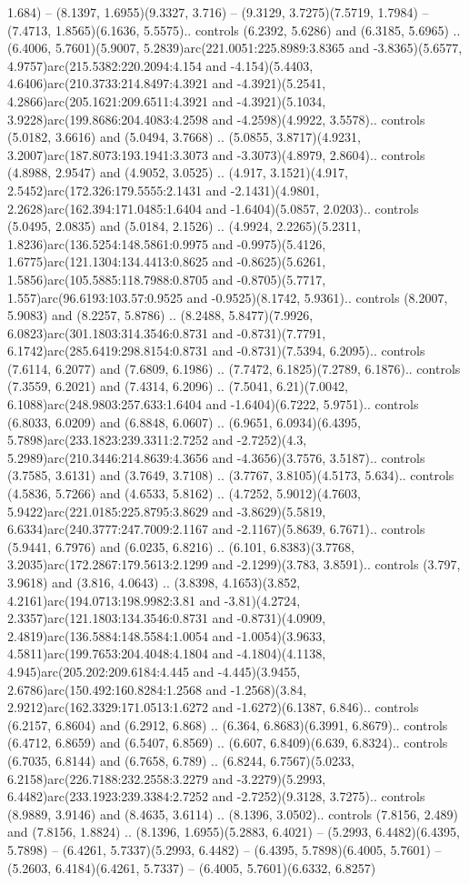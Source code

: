 1.684) -- (8.1397, 1.6955)(9.3327, 3.716) -- (9.3129, 3.7275)(7.5719, 1.7984) -- (7.4713, 1.8565)(6.1636, 5.5575).. controls (6.2392, 5.6286) and (6.3185, 5.6965) .. (6.4006, 5.7601)(5.9007, 5.2839)arc(221.0051:225.8989:3.8365 and -3.8365)(5.6577, 4.9757)arc(215.5382:220.2094:4.154 and -4.154)(5.4403, 4.6406)arc(210.3733:214.8497:4.3921 and -4.3921)(5.2541, 4.2866)arc(205.1621:209.6511:4.3921 and -4.3921)(5.1034, 3.9228)arc(199.8686:204.4083:4.2598 and -4.2598)(4.9922, 3.5578).. controls (5.0182, 3.6616) and (5.0494, 3.7668) .. (5.0855, 3.8717)(4.9231, 3.2007)arc(187.8073:193.1941:3.3073 and -3.3073)(4.8979, 2.8604).. controls (4.8988, 2.9547) and (4.9052, 3.0525) .. (4.917, 3.1521)(4.917, 2.5452)arc(172.326:179.5555:2.1431 and -2.1431)(4.9801, 2.2628)arc(162.394:171.0485:1.6404 and -1.6404)(5.0857, 2.0203).. controls (5.0495, 2.0835) and (5.0184, 2.1526) .. (4.9924, 2.2265)(5.2311, 1.8236)arc(136.5254:148.5861:0.9975 and -0.9975)(5.4126, 1.6775)arc(121.1304:134.4413:0.8625 and -0.8625)(5.6261, 1.5856)arc(105.5885:118.7988:0.8705 and -0.8705)(5.7717, 1.557)arc(96.6193:103.57:0.9525 and -0.9525)(8.1742, 5.9361).. controls (8.2007, 5.9083) and (8.2257, 5.8786) .. (8.2488, 5.8477)(7.9926, 6.0823)arc(301.1803:314.3546:0.8731 and -0.8731)(7.7791, 6.1742)arc(285.6419:298.8154:0.8731 and -0.8731)(7.5394, 6.2095).. controls (7.6114, 6.2077) and (7.6809, 6.1986) .. (7.7472, 6.1825)(7.2789, 6.1876).. controls (7.3559, 6.2021) and (7.4314, 6.2096) .. (7.5041, 6.21)(7.0042, 6.1088)arc(248.9803:257.633:1.6404 and -1.6404)(6.7222, 5.9751).. controls (6.8033, 6.0209) and (6.8848, 6.0607) .. (6.9651, 6.0934)(6.4395, 5.7898)arc(233.1823:239.3311:2.7252 and -2.7252)(4.3, 5.2989)arc(210.3446:214.8639:4.3656 and -4.3656)(3.7576, 3.5187).. controls (3.7585, 3.6131) and (3.7649, 3.7108) .. (3.7767, 3.8105)(4.5173, 5.634).. controls (4.5836, 5.7266) and (4.6533, 5.8162) .. (4.7252, 5.9012)(4.7603, 5.9422)arc(221.0185:225.8795:3.8629 and -3.8629)(5.5819, 6.6334)arc(240.3777:247.7009:2.1167 and -2.1167)(5.8639, 6.7671).. controls (5.9441, 6.7976) and (6.0235, 6.8216) .. (6.101, 6.8383)(3.7768, 3.2035)arc(172.2867:179.5613:2.1299 and -2.1299)(3.783, 3.8591).. controls (3.797, 3.9618) and (3.816, 4.0643) .. (3.8398, 4.1653)(3.852, 4.2161)arc(194.0713:198.9982:3.81 and -3.81)(4.2724, 2.3357)arc(121.1803:134.3546:0.8731 and -0.8731)(4.0909, 2.4819)arc(136.5884:148.5584:1.0054 and -1.0054)(3.9633, 4.5811)arc(199.7653:204.4048:4.1804 and -4.1804)(4.1138, 4.945)arc(205.202:209.6184:4.445 and -4.445)(3.9455, 2.6786)arc(150.492:160.8284:1.2568 and -1.2568)(3.84, 2.9212)arc(162.3329:171.0513:1.6272 and -1.6272)(6.1387, 6.846).. controls (6.2157, 6.8604) and (6.2912, 6.868) .. (6.364, 6.8683)(6.3991, 6.8679).. controls (6.4712, 6.8659) and (6.5407, 6.8569) .. (6.607, 6.8409)(6.639, 6.8324).. controls (6.7035, 6.8144) and (6.7658, 6.789) .. (6.8244, 6.7567)(5.0233, 6.2158)arc(226.7188:232.2558:3.2279 and -3.2279)(5.2993, 6.4482)arc(233.1923:239.3384:2.7252 and -2.7252)(9.3128, 3.7275).. controls (8.9889, 3.9146) and (8.4635, 3.6114) .. (8.1396, 3.0502).. controls (7.8156, 2.489) and (7.8156, 1.8824) .. (8.1396, 1.6955)(5.2883, 6.4021) -- (5.2993, 6.4482)(6.4395, 5.7898) -- (6.4261, 5.7337)(5.2993, 6.4482) -- (6.4395, 5.7898)(6.4005, 5.7601) -- (5.2603, 6.4184)(6.4261, 5.7337) -- (6.4005, 5.7601)(6.6332, 6.8257) 